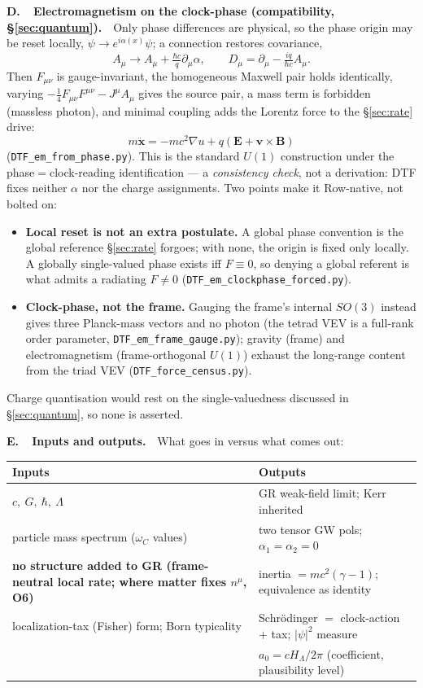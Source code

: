 \documentclass[11pt]{article}
\begin{document}
\medskip
\noindent\textbf{D.\ \ Electromagnetism on the clock-phase (compatibility, \S\ref{sec:quantum}).}\ \
Only phase differences are physical, so the phase origin may be reset locally, $\psi\to e^{i\alpha(x)}\psi$; a
connection restores covariance,
\[ A_\mu\to A_\mu+\tfrac{\hbar c}{q}\partial_\mu\alpha, \qquad D_\mu=\partial_\mu-\tfrac{iq}{\hbar c}A_\mu . \]
Then $F_{\mu\nu}$ is gauge-invariant, the homogeneous Maxwell pair holds identically, varying
$-\tfrac14 F_{\mu\nu}F^{\mu\nu}-J^\mu A_\mu$ gives the source pair, a mass term is forbidden (massless photon),
and minimal coupling adds the Lorentz force to the \S\ref{sec:rate} drive:
\[ m\ddot{\mathbf x}=-mc^2\nabla u+q(\mathbf E+\mathbf v\times\mathbf B) \]
(\texttt{DTF\_em\_from\_phase.py}). This is the standard $U(1)$ construction under the phase${}={}$clock-reading
identification --- a \emph{consistency check}, not a derivation: DTF fixes neither $\alpha$ nor the charge
assignments. Two points make it Row-native, not bolted on:
\begin{itemize}[leftmargin=1.4em,itemsep=1pt,topsep=2pt]
\item \textbf{Local reset is not an extra postulate.} A global phase convention is the global reference \S\ref{sec:rate}
  forgoes; with none, the origin is fixed only locally. A globally single-valued phase exists iff $F\equiv0$,
  so denying a global referent is what admits a radiating $F\neq0$ (\texttt{DTF\_em\_clockphase\_forced.py}).
\item \textbf{Clock-phase, not the frame.} Gauging the frame's internal $SO(3)$ instead gives three
  Planck-mass vectors and no photon (the tetrad VEV is a full-rank order parameter,
  \texttt{DTF\_em\_frame\_gauge.py}); gravity (frame) and electromagnetism (frame-orthogonal $U(1)$) exhaust
  the long-range content from the triad VEV (\texttt{DTF\_force\_census.py}).
\end{itemize}
Charge quantisation would rest on the single-valuedness discussed in \S\ref{sec:quantum}, so none is asserted.

\medskip
\noindent\textbf{E.\ \ Inputs and outputs.}\ \
What goes in versus what comes out:
\begin{center}\small
\renewcommand{\arraystretch}{1.15}
\begin{tabular}{@{}p{} p{}@{}}
\toprule
\textbf{Inputs} & \textbf{Outputs}\\\midrule
$c,\ G,\ \hbar,\ \Lambda$ & GR weak-field limit; Kerr inherited\\
particle mass spectrum ($\omega_C$ values) & two tensor GW pols; $\alpha_1=\alpha_2=0$\\
\textbf{no structure added to GR (frame-neutral local rate; where matter fixes $n^\mu$, O6)} & inertia $=mc^2(\gamma-1)$; equivalence as identity\\
localization-tax (Fisher) form; Born typicality & Schr\"odinger $=$ clock-action $+$ tax; $|\psi|^2$ measure\\
 & $a_0=cH_\Lambda/2\pi$ (coefficient, plausibility level)\\
\bottomrule
\end{tabular}
\end{center}
\end{document}
